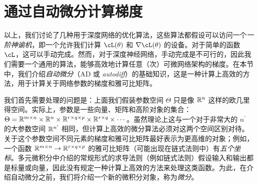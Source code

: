 \documentclass[../../book-main.tex]{subfiles}
\begin{document}



\section{通过自动微分计算梯度}\label{sec:autodiff}

以上，我们讨论了几种用于深度网络的优化算法，这些算法都假设可以访问一个\textit{一阶神谕机}，即一个允许我们计算 \(\cL(\theta)\) 和 \(\nabla \cL(\theta)\) 的设备。对于简单的函数 \(\cL\)，这可以手动完成。然而，对于深度神经网络，手动完成是不可行的，因此我们需要一个通用的算法，能够高效地计算任意（次）可微网络架构的梯度。在本节中，我们介绍\textit{自动微分}（AD 或 \textit{autodiff}）的基础知识，这是一种计算上高效的方法，用于计算关于网络参数的梯度和雅可比矩阵。

我们首先需要处理的问题是：上面我们假装参数空间 \(\Theta\) 只是像 \(\mathbb{R}^{n}\) 这样的欧几里得空间。实际上，参数是一些向量、矩阵和高阶对象的集合：\(\Theta = \mathbb{R}^{m \times n} \times \mathbb{R}^{n} \times \mathbb{R}^{r \times q \times p} \times \mathbb{R}^{r \times q} \times \cdots\)。虽然理论上这与一个对于非常大的 \(n^{\prime}\) 的大参数空间 \(\mathbb{R}^{n^{\prime}}\) 相同，但计算上高效的微分算法必须对这两个空间区别对待。关于这个参数空间不同元素的梯度和雅可比矩阵最好表示为更高维的对象；例如，一个函数 \(\mathbb{R}^{m \times n} \to \mathbb{R}^{r \times q \times p}\) 的雅可比矩阵（可能出现在链式法则中）有\textit{五个坐标}。多元微积分中介绍的常规形式的求导法则（例如链式法则）假设输入和输出都是标量或向量，因此没有规定一种计算上高效的方法来处理这类函数。为此，在介绍自动微分之前，我们将介绍一个新的微积分对象，称为\textit{微分}。
\end{document}
